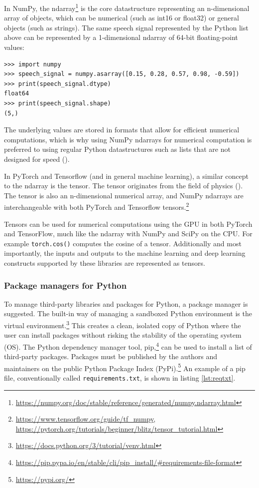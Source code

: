 \documentclass[report.tex]{subfiles}
\begin{document}
In NumPy, the ndarray\footnote{\url{https://numpy.org/doc/stable/reference/generated/numpy.ndarray.html}} is the core datastructure representing an n-dimensional array of objects, which can be numerical (such as int16 or float32) or general objects (such as strings). The same speech signal represented by the Python list above can be represented by a 1-dimensional ndarray of 64-bit floating-point values:

\begin{listing}[!ht]
\centering
\begin{BVerbatim}
>>> import numpy
>>> speech_signal = numpy.asarray([0.15, 0.28, 0.57, 0.98, -0.59])
>>> print(speech_signal.dtype)
float64
>>> print(speech_signal.shape)
(5,)
\end{BVerbatim}
\end{listing}

The underlying values are stored in formats that allow for efficient numerical computations, which is why using NumPy ndarrays for numerical computation is preferred to using regular Python datastructures such as lists that are not designed for speed (\cite{ndarrayfast}).

In PyTorch and Tensorflow (and in general machine learning), a similar concept to the ndarray is the tensor. The tensor originates from the field of physics (\cite{whatistensor}). The tensor is also an n-dimensional numerical array, and NumPy ndarrays are interchangeable with both PyTorch and Tensorflow tensors.\footnote{\url{https://www.tensorflow.org/guide/tf_numpy}, \url{https://pytorch.org/tutorials/beginner/blitz/tensor_tutorial.html}}

Tensors can be used for numerical computations using the GPU in both PyTorch and TensorFlow, much like the ndarray with NumPy and SciPy on the CPU. For example \Verb#torch.cos()# computes the cosine of a tensor. Additionally and most importantly, the inputs and outputs to the machine learning and deep learning constructs supported by these libraries are represented as tensors.

\subsubsection{Package managers for Python}

To manage third-party libraries and packages for Python, a package manager is suggested. The built-in way of managing a sandboxed Python environment is the virtual environment.\footnote{\url{https://docs.python.org/3/tutorial/venv.html}} This creates a clean, isolated copy of Python where the user can install packages without risking the stability of the operating system (OS). The Python dependency manager tool, pip,\footnote{\url{https://pip.pypa.io/en/stable/cli/pip_install/\#requirements-file-format}} can be used to install a list of third-party packages. Packages must be published by the authors and maintainers on the public Python Package Index (PyPi).\footnote{\url{https://pypi.org/}} An example of a pip file, conventionally called \Verb#requirements.txt#, is shown in listing \ref{lst:reqtxt}.
\end{document}
